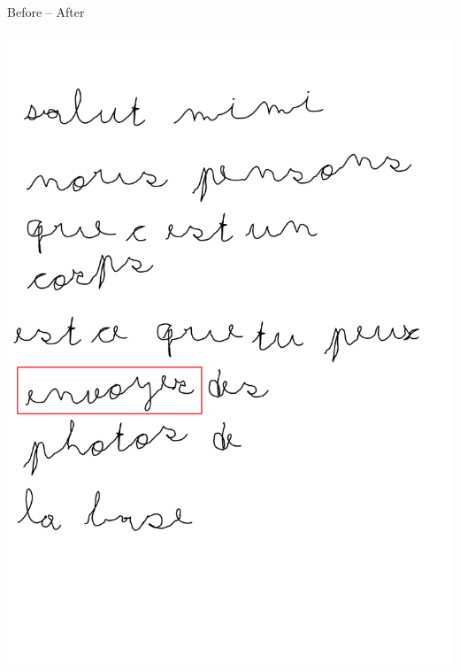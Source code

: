 \documentclass[xcolor=table]{beamer}
\begin{document}
\begin{frame}{Before -- After}
\begin{center}
{            \hspace{1cm}%
        \includegraphics[width=0.43\linewidth]{cowriter/lettre-final-highlight}
        }
    \end{center}
\end{frame}



\end{document}
